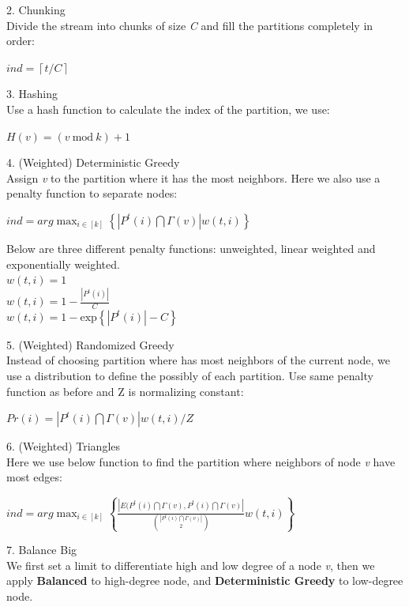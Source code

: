 \documentclass[12pt]{article}
\begin{document}
2. Chunking\\
Divide the stream into chunks of size \emph{C} and fill the partitions completely in order:
\begin {center}
$ind = \left \lceil t/C \right \rceil$
\end{center}

3. Hashing\\
Use a hash function to calculate the index of the partition, we use:
\begin{center}
$H(v)=(v\ \text{mod}\ k)+1$
\end{center}

4. (Weighted) Deterministic Greedy\\
Assign \emph{v} to the partition where it has the most neighbors. Here we also use a penalty function to separate nodes:
\begin{center}
$ind = arg \max_{i\in \left [ k \right ]}\left \{ \left | P^{t}(i)\bigcap \Gamma (v) \right |w(t,i) \right \}$
\end{center}
Below are three different penalty functions: unweighted, linear weighted and exponentially weighted.
\\
$w(t,i)=1$\\
$w(t,i)=1-\frac{\left | P^{t}(i) \right |}{C}$\\
$w(t,i)=1-\text{exp}\left \{ \left | P^{t}(i) \right |-C \right \}$

5. (Weighted) Randomized Greedy\\
Instead of choosing partition where has most neighbors of the current node, we use a distribution to define the possibly of each partition. Use same penalty function as before and Z is normalizing constant:
\begin{center}
$Pr(i) =  \left | P^{t}(i)\bigcap \Gamma (v) \right |w(t,i)/Z$
\end{center}

6. (Weighted) Triangles\\
Here we use below function to find the partition where neighbors of node \emph{v} have most edges:
\begin{center}
$ind = arg \max_{i\in \left [ k \right ]}\left \{ \frac{ \left | E(P^{t}(i)\bigcap \Gamma (v),P^{t}(i)\bigcap \Gamma (v) \right |}{\binom{\left | P^{t}(i)\bigcap \Gamma (v) \right |}{2}}w(t,i) \right \}$
\end {center}

7. Balance Big\\
We first set a limit to differentiate high and low degree of a node \emph{v}, then we apply \textbf{Balanced} to high-degree node, and \textbf{Deterministic Greedy} to low-degree node.
\end{document}
